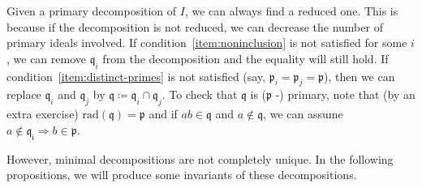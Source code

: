 \begin{rk}
    Given a primary decomposition of $I$, we can always find a reduced one.
    This is because if the decomposition is not reduced,
    we can decrease the number of primary ideals involved.
    If condition~\ref{item:noninclusion} is not satisfied for some $i$,
    we can remove $\mathfrak{q}_i$ from the decomposition and the equality will still hold.
    If condition~\ref{item:distinct-primes} is not satisfied
    (say, $\mathfrak{p}_i = \mathfrak{p}_j = \mathfrak{p}$),
    then we can replace $\mathfrak{q}_i$ and $\mathfrak{q}_j$ by
    $\mathfrak{q} \coloneqq \mathfrak{q}_i \cap \mathfrak{q}_j$.
    To check that $\mathfrak{q}$ is ($\mathfrak{p}$ -) primary,
    note that (by an extra exercise) $\text{rad}(\mathfrak{q}) = \mathfrak{p}$
    and if $ab \in \mathfrak{q}$ and $a \notin \mathfrak{q}$,
    we can assume $a \notin \mathfrak{q_i} \Rightarrow b \in \mathfrak{p}$.
\end{rk}

\begin{rk}
    However, minimal decompositions are not completely unique.
    In the following propositions, we will produce some invariants of these decompositions.
\end{rk}

